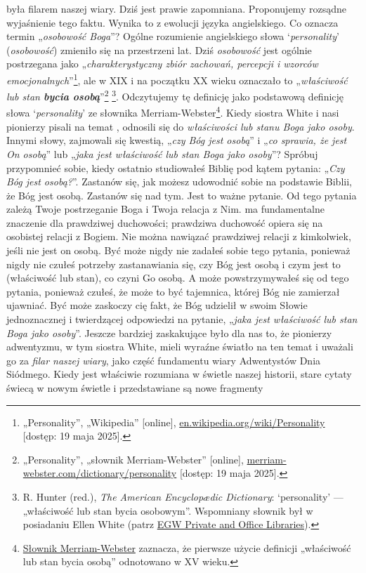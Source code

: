  była filarem naszej wiary. Dziś jest prawie zapomniana. Proponujemy rozsądne wyjaśnienie tego faktu. Wynika to z ewolucji języka angielskiego. Co oznacza termin „\textit{osobowość Boga}”? Ogólne rozumienie angielskiego słowa ‘\textit{personality}’ (\textit{osobowość}) zmieniło się na przestrzeni lat. Dziś \textit{osobowość} jest ogólnie postrzegana jako „\textit{charakterystyczny zbiór zachowań, percepcji i wzorców emocjonalnych}”\footnote{„Personality”, „Wikipedia” [online], \href{https://en.wikipedia.org/wiki/Personality}{en.wikipedia.org/wiki/Personality} [dostęp: 19 maja 2025].}, ale w XIX i na początku XX wieku oznaczało to „\textit{właściwość lub stan \textbf{bycia osobą}}”\footnote{„Personality”, „słownik Merriam-Webster” [online], \href{https://www.merriam-webster.com/dictionary/personality}{merriam-webster.com/dictionary/personality} [dostęp: 19 maja 2025].} \footnote{R. Hunter (red.), \textit{The American Encyclopædic Dictionary}: ‘personality’ — „właściwość lub stan bycia osobowym”. Wspomniany słownik był w posiadaniu Ellen White (patrz \href{https://repo.adventistdigitallibrary.org/PDFs/adl-22/adl-22251050.pdf?_ga=2.116010630.1065317374.1621993520-1506151612.1617862694&fbclid=IwAR3vwmp8jxtnpPEKv0KD9mCv8dJpmRGoyIXW0CkbQAjbU0h6YaBGqhgBzbk}{EGW Private and Office Libraries}).}. Odczytujemy tę definicję jako podstawową definicję słowa ‘\textit{personality}’ ze słownika Merriam-Webster\footnote{\href{https://www.merriam-webster.com/dictionary/personality\#word-history}{Słownik Merriam-Webster} zaznacza, że pierwsze użycie definicji „właściwość lub stan bycia osobą” odnotowano w XV wieku.}. Kiedy siostra White i nasi pionierzy pisali na temat , odnosili się do \textit{właściwości lub stanu Boga jako osoby}. Innymi słowy, zajmowali się kwestią, „\textit{czy Bóg jest osobą}” i „\textit{co sprawia, że jest On osobą}” lub „\textit{jaka jest właściwość lub stan Boga jako osoby}”? Spróbuj przypomnieć sobie, kiedy ostatnio studiowałeś Biblię pod kątem pytania: „\textit{Czy Bóg jest osobą?}”. Zastanów się, jak możesz udowodnić sobie na podstawie Biblii, że Bóg jest osobą. Zastanów się nad tym. Jest to ważne pytanie. Od tego pytania zależą Twoje postrzeganie Boga i Twoja relacja z Nim.  ma fundamentalne znaczenie dla prawdziwej duchowości; prawdziwa duchowość opiera się na osobistej relacji z Bogiem. Nie można nawiązać prawdziwej relacji z kimkolwiek, jeśli nie jest on osobą. Być może nigdy nie zadałeś sobie tego pytania, ponieważ nigdy nie czułeś potrzeby zastanawiania się, czy Bóg jest osobą i czym jest to (właściwość lub stan), co czyni Go osobą. A może powstrzymywałeś się od tego pytania, ponieważ czułeś, że może to być tajemnica, której Bóg nie zamierzał ujawniać. Być może zaskoczy cię fakt, że Bóg udzielił w swoim Słowie jednoznacznej i twierdzącej odpowiedzi na pytanie, „\textit{jaka jest właściwość lub stan Boga jako osoby}”. Jeszcze bardziej zaskakujące było dla nas to, że pionierzy adwentyzmu, w tym siostra White, mieli wyraźne światło na ten temat i uważali go za \textit{filar naszej wiary}, jako część fundamentu wiary Adwentystów Dnia Siódmego. Kiedy  jest właściwie rozumiana w świetle naszej historii, stare cytaty świecą w nowym świetle i przedstawiane są nowe fragmenty 